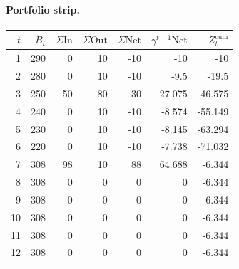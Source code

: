 \documentclass[12pt, a4paper]{article}
\begin{document}
\paragraph{Portfolio strip.}
\begin{center}
\begin{tabular}{rrrrrrr}
\toprule
$t$ & $B_t$ & $\Sigma\mathrm{In}$ & $\Sigma\mathrm{Out}$ & $\Sigma\mathrm{Net}$ & $\gamma^{t-1}\mathrm{Net}$ & $Z_t^{\mathrm{cum}}$\\
\midrule
1 & 290 & 0 & 10 & -10 & -10 & -10 \\
2 & 280 & 0 & 10 & -10 & -9.5 & -19.5 \\
3 & 250 & 50 & 80 & -30 & -27.075 & -46.575 \\
4 & 240 & 0 & 10 & -10 & -8.574 & -55.149 \\
5 & 230 & 0 & 10 & -10 & -8.145 & -63.294 \\
6 & 220 & 0 & 10 & -10 & -7.738 & -71.032 \\
7 & 308 & 98 & 10 & 88 & 64.688 & -6.344 \\
8 & 308 & 0 & 0 & 0 & 0 & -6.344 \\
9 & 308 & 0 & 0 & 0 & 0 & -6.344 \\
10 & 308 & 0 & 0 & 0 & 0 & -6.344 \\
11 & 308 & 0 & 0 & 0 & 0 & -6.344 \\
12 & 308 & 0 & 0 & 0 & 0 & -6.344 \\
\bottomrule
\end{tabular}
\end{center}
\end{document}
